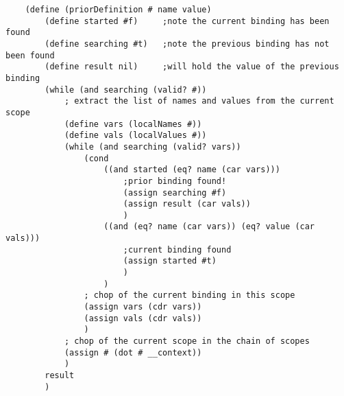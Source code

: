 \begin{verbatim}
    (define (priorDefinition # name value)
        (define started #f)     ;note the current binding has been found
        (define searching #t)   ;note the previous binding has not been found
        (define result nil)     ;will hold the value of the previous binding
        (while (and searching (valid? #))
            ; extract the list of names and values from the current scope
            (define vars (localNames #))
            (define vals (localValues #))
            (while (and searching (valid? vars))
                (cond
                    ((and started (eq? name (car vars)))
                        ;prior binding found!
                        (assign searching #f)
                        (assign result (car vals))
                        )
                    ((and (eq? name (car vars)) (eq? value (car vals)))
                        ;current binding found
                        (assign started #t)
                        )
                    )
                ; chop of the current binding in this scope
                (assign vars (cdr vars))
                (assign vals (cdr vals))
                )
            ; chop of the current scope in the chain of scopes
            (assign # (dot # __context))
            )
        result
        )
\end{verbatim}
